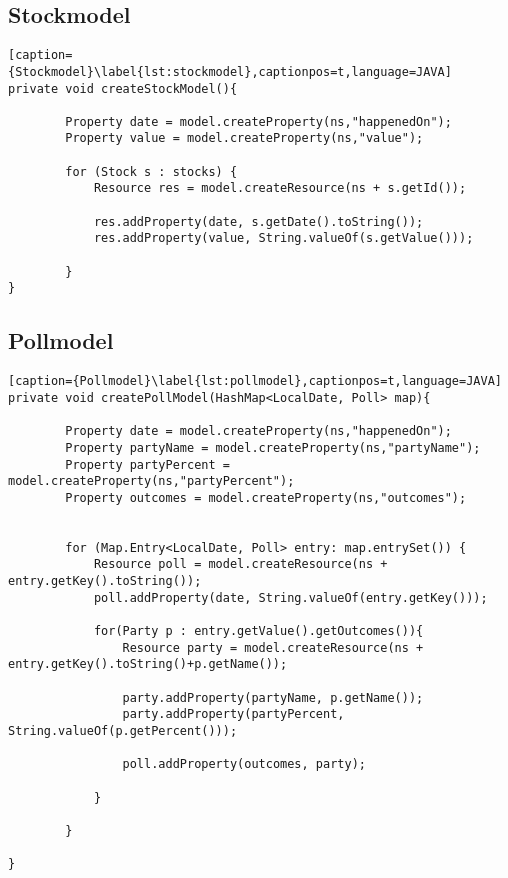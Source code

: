 \documentclass[a4paper,10pt,parskip]{article}
\begin{document}
\subsection{Stockmodel}
\begin{lstlisting}[caption={Stockmodel}\label{lst:stockmodel},captionpos=t,language=JAVA]
private void createStockModel(){

        Property date = model.createProperty(ns,"happenedOn");
        Property value = model.createProperty(ns,"value");

        for (Stock s : stocks) {
            Resource res = model.createResource(ns + s.getId());

            res.addProperty(date, s.getDate().toString());
            res.addProperty(value, String.valueOf(s.getValue()));

        }
}
\end{lstlisting}
\subsection{Pollmodel}
\begin{lstlisting}[caption={Pollmodel}\label{lst:pollmodel},captionpos=t,language=JAVA]
private void createPollModel(HashMap<LocalDate, Poll> map){

        Property date = model.createProperty(ns,"happenedOn");
        Property partyName = model.createProperty(ns,"partyName");
        Property partyPercent = model.createProperty(ns,"partyPercent");
        Property outcomes = model.createProperty(ns,"outcomes");


        for (Map.Entry<LocalDate, Poll> entry: map.entrySet()) {
            Resource poll = model.createResource(ns + entry.getKey().toString());
            poll.addProperty(date, String.valueOf(entry.getKey()));

            for(Party p : entry.getValue().getOutcomes()){
                Resource party = model.createResource(ns + entry.getKey().toString()+p.getName());

                party.addProperty(partyName, p.getName());
                party.addProperty(partyPercent, String.valueOf(p.getPercent()));

                poll.addProperty(outcomes, party);

            }

        }

}


\end{lstlisting}
\newpage
\nocite{*}
\printbibliography

\newpage
\lstlistoflistings

%
%
\end{document}

